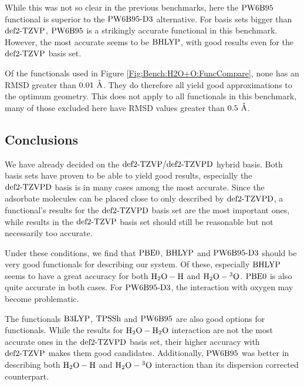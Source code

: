 \documentclass[8.5pt,twoside,twocolumn]{article}
\renewcommand{\Ang}{\mathring{\te{A}}}
\newcommand\kmo{\enmat{\te {kJ/mol}}}
\theoremstyle{standard}
\begin{document}
While this was not so clear in the previous benchmarks, here the $\text{PW6B95}$
functional is superior to the $\text{PW6B95}\text{-D3}$ alternative. For basis sets
bigger than $\text{def2-TZVP}$, $\text{PW6B95}$ is a strikingly accurate functional in this benchmark.
However, the most accurate seems to be $\text{BHLYP}$, with good results even for
the $\text{def2-TZVP}$ basis set.

Of the functionals used in Figure \ref{Fig:Bench:H2O+O:FuncCompare}, none
has an RMSD greater than $0.01\ \Ang$. They do therefore all yield good
approximations to the optimum geometry. This does not apply to all functionals
in this benchmark, many of those excluded here have RMSD values greater
than $0.5\ \Ang$. 

\subsection{Conclusions}

We have already decided on the $\text{def2-TZVP}/\text{def2-TZVPD}$ hybrid basis. Both basis sets
have proven to be able to yield good results, especially the $\text{def2-TZVPD}$ basis
is in many cases among the most accurate. Since the adsorbate molecules
can be placed close to only described by $\text{def2-TZVPD}$, a functional's results for
the $\text{def2-TZVPD}$ basis set are the most important ones, while results in the
$\text{def2-TZVP}$ basis set should still be reasonable but not necessarily too accurate.

Under these conditions, we find that $\text{PBE0}$, $\text{BHLYP}$ and $\text{PW6B95}\text{-D3}$ should be
very good functionals for describing our system. Of these, especially $\text{BHLYP}$
seems to have a great accuracy for both $\mbox{\ensuremath{\text H _2 \text O-\text H}}$ and $\mbox{\ensuremath{\text H _2 \text O-\hspace{.2pt} ^3\text{O}}}$. $\text{PBE0}$ is also
quite accurate in both cases. For $\text{PW6B95}\text{-D3}$, the interaction with oxygen
may become problematic. 

The functionals $\text{B3LYP}$, $\text{TPSSh}$ and $\text{PW6B95}$ are also good options for
functionals. While the results for $\mbox{\ensuremath{\text H _2 \text O-\text H _2 \text O}}$ interaction are not the most
accurate ones in the $\text{def2-TZVPD}$ basis set, their higher accuracy with $\text{def2-TZVP}$
makes them good candidates. Additionally, $\text{PW6B95}$ was better in describing both
$\mbox{\ensuremath{\text H _2 \text O-\text H}}$ and $\mbox{\ensuremath{\text H _2 \text O-\hspace{.2pt} ^3\text{O}}}$ interaction than its dispersion corrected counterpart.
\end{document}
